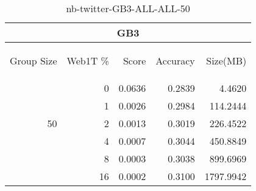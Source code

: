 \begin{center}
\begin{table}[htbp]
\begin{tabular}{ | r | r | r | r | r |}
\hline
\multicolumn{5}{|c|}{GB3}\\
\hline
\begin{sideways}Group Size\end{sideways} & \begin{sideways}Web1T \%\end{sideways} & \begin{sideways}Score\end{sideways} & \begin{sideways}Accuracy\end{sideways} & \begin{sideways}Size(MB)\end{sideways}\\
\hline
\multirow{5}{*}{50}
 & 0 & 0.0636 & 0.2839 & 4.4620\\ \cline{2-5}
 & 1 & 0.0026 & 0.2984 & 114.2444\\ \cline{2-5}
 & 2 & 0.0013 & 0.3019 & 226.4522\\ \cline{2-5}
 & 4 & 0.0007 & 0.3044 & 450.8849\\ \cline{2-5}
 & 8 & 0.0003 & 0.3038 & 899.6969\\ \cline{2-5}
 & 16 & 0.0002 & 0.3100 & 1797.9942\\ \cline{2-5}
\hline
\end{tabular}
\caption{nb-twitter-GB3-ALL-ALL-50}
\label{table:nb-twitter-GB3-ALL-ALL-50}
\end{table}
\end{center}

